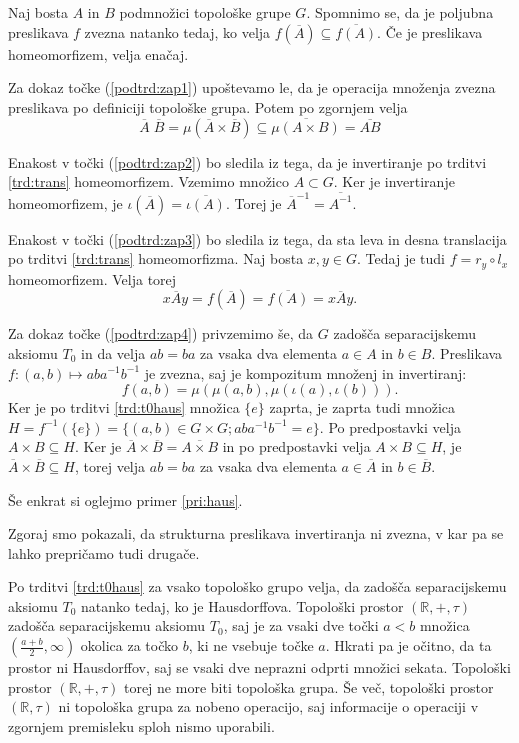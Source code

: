 \documentclass[mat1]{fmfdelo}
\newcommand{\R}{\mathbb R}
\newcommand{\closure}[1]{\overline{#1}}
\begin{document}
\begin{dokaz}
	Naj bosta $A$ in $B$ podmnožici topološke grupe $G$. Spomnimo se, da je poljubna preslikava $f$ zvezna natanko tedaj, ko velja $f(\closure{A}) \subseteq \closure{f(A)}$. Če je preslikava homeomorfizem, velja enačaj.
	
	Za dokaz točke (\ref{podtrd:zap1}) upoštevamo le, da je operacija množenja zvezna preslikava po definiciji topološke grupa. Potem po zgornjem velja
	\[ \closure{A}\;\closure{B} = \mu(\closure{A}\times\closure{B}) \subseteq \closure{\mu(A\times B)} = \closure{AB}\]
	
	Enakost v točki (\ref{podtrd:zap2}) bo sledila iz tega, da je invertiranje po trditvi \ref{trd:trans} homeomorfizem. Vzemimo množico $A \subset G$. Ker je invertiranje homeomorfizem, je $\iota(\closure{A}) = \closure{\iota(A)}$. Torej je $\closure{A}^{-1} = \closure{A^{-1}}$.
	
	Enakost v točki (\ref{podtrd:zap3}) bo sledila iz tega, da sta leva in desna translacija po trditvi \ref{trd:trans} homeomorfizma. Naj bosta $x, y \in G$. Tedaj je tudi $f = r_y \circ l_x$ homeomorfizem. Velja torej
	\[ x\closure{A}y = f(\closure{A}) = \closure{f(A)} = \closure{xAy}. \]
	
	Za dokaz točke (\ref{podtrd:zap4}) privzemimo še, da $G$ zadošča separacijskemu aksiomu $T_0$ in da velja $ab = ba$ za vsaka dva elementa $a \in A$ in $b \in B$. Preslikava $f\colon (a,b) \mapsto aba^{-1}b^{-1}$ je zvezna, saj je kompozitum množenj in invertiranj:
	\[ f(a, b) = \mu(\mu(a, b),\mu(\iota(a), \iota(b))). \]
	Ker je po trditvi \ref{trd:t0haus} množica $\lbrace e \rbrace$ zaprta, je zaprta tudi množica $H = f^{-1}(\lbrace e \rbrace) = \lbrace (a, b) \in G \times G; aba^{-1}b^{-1} = e \rbrace$. Po predpostavki velja $A \times B \subseteq H$.
	Ker je $\closure{A}\times\closure{B} = \closure{A \times B}$ in po predpostavki velja $A \times B \subseteq H$, je $\closure{A}\times\closure{B} \subseteq H$, torej velja $ab = ba$ za vsaka dva elementa $a \in \closure{A}$ in $b \in \closure{B}$.
\end{dokaz}

Še enkrat si oglejmo primer \ref{pri:haus}.
\begin{primer}\label{pri:haus2}
	Zgoraj smo pokazali, da strukturna preslikava invertiranja ni zvezna, v kar pa se lahko prepričamo tudi drugače.
	
	Po trditvi \ref{trd:t0haus} za vsako topološko grupo velja, da zadošča separacijskemu aksiomu $T_0$ natanko tedaj, ko je Hausdorffova. Topološki prostor $(\R, +, \tau)$ zadošča separacijskemu aksiomu $T_0$, saj je za vsaki dve točki $a < b$ množica $(\frac{a+b}{2}, \infty)$ okolica za točko $b$, ki ne vsebuje točke $a$. Hkrati pa je očitno, da ta prostor ni Hausdorffov, saj se vsaki dve neprazni odprti množici sekata. Topološki prostor $(\R, +, \tau)$ torej ne more biti topološka grupa. Še več, topološki prostor $(\R, \tau)$ ni topološka grupa za nobeno operacijo, saj informacije o operaciji v zgornjem premisleku sploh nismo uporabili.
\end{primer}
\end{document}
